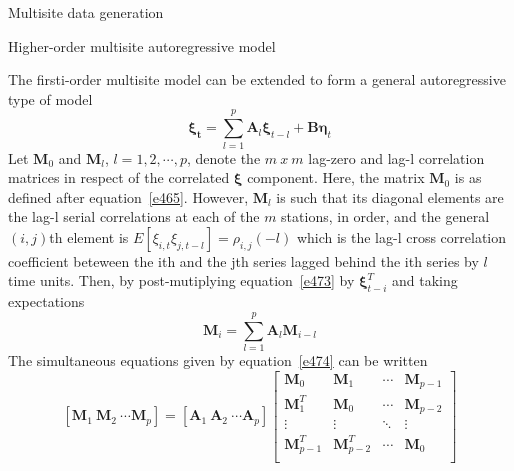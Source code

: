 \documentclass[8pt]{beamer}
\renewcommand{\emph}[1]{\textcolor{myorange}{#1}}
\newcommand{\ve}[1]{\boldsymbol{#1}}
\begin{document}
\begin{frame}{Multisite data generation}
    \begin{block}{Higher-order multisite autoregressive model}
    \end{block}
    The \emph{firsti-order multisite model} can be extended to form a general autoregressive type of model
    \begin{equation}
        \boldsymbol{\xi_t} = \sum_{l=1}^{p} \mathbf{A}_l \boldsymbol{\xi}_{t-l} + \mathbf{B} \boldsymbol{\eta}_t
        \label{e473}
    \end{equation}
    Let $\mathbf{M}_0$ and $\mathbf{M}_l$, $l = 1,2,\cdots,p$, denote the $m\ x\ m$ \emph{lag-zero} and \emph{lag-l correlation matrices} in respect of the correlated $\ve{\xi}$ component. Here, the matrix $\mathbf{M}_0$ is as defined after equation~\ref{e465}. However, $\mathbf{M}_l$ is such that its diagonal elements are the lag-l serial correlations at each of the $m$ stations, in order, and the general $(i,j)$th element is $E[\xi_{i,t} \xi_{j,t-l}] = \rho_{i,j} (-l)$ which is the lag-l cross correlation coefficient beteween the ith and the jth series lagged behind the ith series by $l$ time units. Then, by post-mutiplying equation~\ref{e473} by $\ve{\xi}_{t-i}^T$ and taking expectations
    \begin{equation}
        \mathbf{M}_i = \sum_{l=1}^{p} \mathbf{A}_l \mathbf{M}_{i-l} 
        \label{e474}
    \end{equation}
    The simultaneous equations given by equation~\ref{e474} can be written
\[
    \left[\mathbf{M}_1\ \mathbf{M}_2\ \cdots \mathbf{M}_p \right] = \left[\mathbf{A}_1\ \mathbf{A}_2\ \cdots \mathbf{A}_p \right] 
\begin{bmatrix}
    \mathbf{M}_0 & \mathbf{M}_1   & \cdots & \mathbf{M}_{p-1} \\
    \mathbf{M}_1^T & \mathbf{M}_0   & \cdots & \mathbf{M}_{p-2} \\
    \vdots &  \vdots & \ddots & \vdots \\
    \mathbf{M}_{p-1}^T & \mathbf{M}_{p-2}^T  & \cdots & \mathbf{M}_0 \\
\end{bmatrix}
\]

\end{frame}
\end{document}
